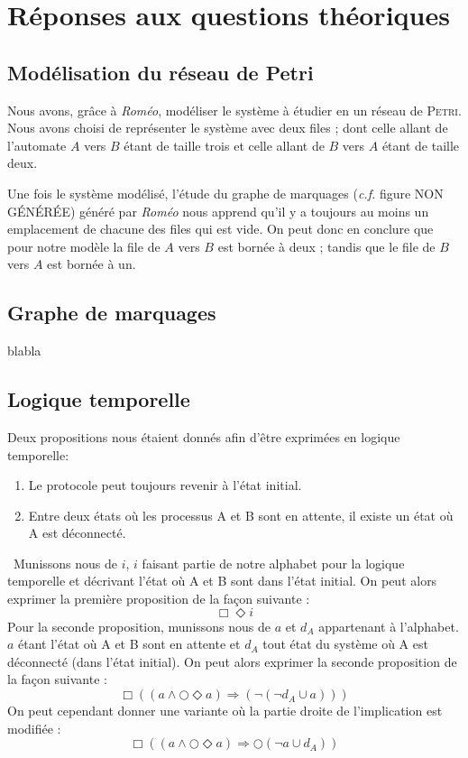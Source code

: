 \chapter{Réponses aux questions théoriques}\label{chap:Rep}
\section{Modélisation du réseau de Petri}
Nous avons, grâce à \emph{Roméo}, modéliser le système à étudier en un réseau de \textsc{Petri}. Nous avons choisi de représenter le système avec deux files ; dont celle allant de l'automate $A$ vers $B$ étant de taille trois et celle allant de $B$ vers $A$ étant de taille deux.

Une fois le système modélisé, l'étude du graphe de marquages (\emph{c.f.} figure NON GÉNÉRÉE) généré par \emph{Roméo} nous apprend qu'il y a toujours au moins un emplacement de chacune des files qui est vide. On peut donc en conclure que pour notre modèle la file de $A$ vers $B$ est bornée à deux ; tandis que le file de $B$ vers $A$ est bornée à un.

\section{Graphe de marquages}

blabla

\section{Logique temporelle}

Deux propositions nous étaient donnés afin d'être exprimées en logique temporelle:
\begin{enumerate}
 \item Le protocole peut toujours revenir à l’état initial.
 \item Entre deux états où les processus A et B sont en attente, il existe un état où A est déconnecté.
\end{enumerate}
\
Munissons nous de $i$, $i$ faisant partie de notre alphabet pour la logique temporelle et décrivant l'état où A et B sont dans l'état initial. On peut alors exprimer la première proposition de la façon suivante :
\begin{equation}
 \Box\Diamond i
\end{equation}
Pour la seconde proposition, munissons nous de $a$ et $d_A$ appartenant à l'alphabet. $a$ étant l'état où A et B sont en attente et $d_A$ tout état du système où A est déconnecté (dans l'état initial). On peut alors exprimer la seconde proposition de la façon suivante :
\begin{equation}
 \Box((a\wedge\bigcirc\Diamond a)\Longrightarrow(\neg(\neg d_A\cup a)))
\end{equation}
On peut cependant donner une variante où la partie droite de l'implication est modifiée :
\begin{equation}
 \Box((a\wedge\bigcirc\Diamond a)\Longrightarrow\bigcirc(\neg a\cup d_A))
\end{equation}


